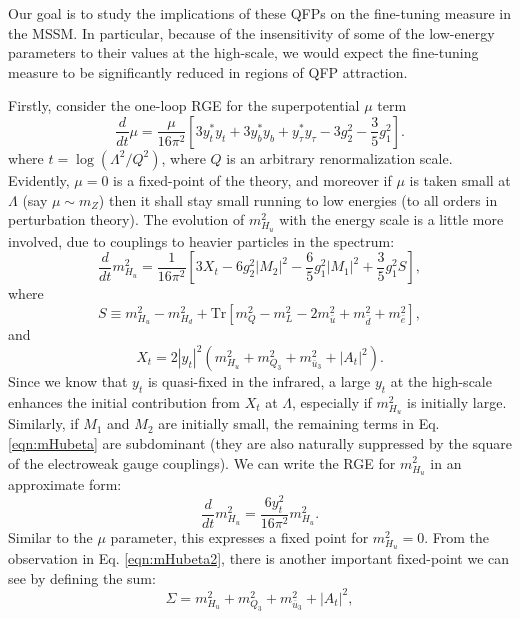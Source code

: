 Our goal is to study the implications of these QFPs on the fine-tuning measure in the MSSM. In particular, because of the insensitivity of some of the low-energy parameters to their values at the high-scale, we would expect the fine-tuning measure to be significantly reduced in regions of QFP attraction.

Firstly, consider the one-loop RGE for the superpotential $\mu$ term
\begin{equation}
\frac{d}{dt}\mu=\frac{\mu}{16\pi^2}\left[3y^*_ty_t+3y^*_by_b+y^*_{\tau}y_{\tau}-3g^2_2-\frac{3}{5}g^2_1\right].
\end{equation}
where $t=\log(\Lambda^2/Q^2)$, where $Q$ is an arbitrary renormalization scale. Evidently, $\mu=0$ is a fixed-point of the theory, and moreover if $\mu$ is taken small at $\Lambda$ (say $\mu \sim m_Z$) then it shall stay small running to low energies (to all orders in perturbation theory). The evolution of $m^2_{H_u}$ with the energy scale is a little more involved, due to couplings to heavier particles in the spectrum:
\begin{equation}
\frac{d}{dt}m^2_{H_u}=\frac{1}{16\pi^2}\left[3X_t-6g^2_2|M_2|^2-\frac{6}{5}g^2_1|M_1|^2+\frac{3}{5}g^2_1S\right],
\label{eqn:mHubeta}
\end{equation}
where
\begin{equation}
S\equiv m^2_{H_u}-m^2_{H_d}+\text{Tr}[m^2_Q-m^2_L-2m^2_{\bar{u}}+m^2_{\bar{d}}+m^2_{\bar{e}}],
\end{equation}
and
\begin{equation}
X_t=2|y_t|^2(m^2_{H_u}+m^2_{Q_3}+m^2_{\bar{u}_3}+|A_t|^2).
\end{equation}
Since we know that $y_t$ is quasi-fixed in the infrared, a large $y_t$ at the high-scale enhances the initial contribution from $X_t$ at $\Lambda$, especially if $m^2_{H_u}$ is initially large. Similarly, if $M_1$ and $M_2$ are initially small, the remaining terms in Eq. \ref{eqn:mHubeta} are subdominant (they are also naturally suppressed by the square of the electroweak gauge couplings). We can write the RGE for $m^2_{H_u}$ in an approximate form:
\begin{equation}
\frac{d}{dt}m^2_{H_u}=\frac{6 y^2_t}{16\pi^2}m^2_{H_u}.
\label{eqn:mHubeta2}
\end{equation}
Similar to the $\mu$ parameter, this expresses a fixed point for $m^2_{H_u}=0$. From the observation in Eq. \ref{eqn:mHubeta2}, there is another important fixed-point we can see by defining the sum:
\begin{equation}
\Sigma=m^2_{H_u}+m^2_{Q_3}+m^2_{\bar{u}_3}+|A_t|^2,
\end{equation}
